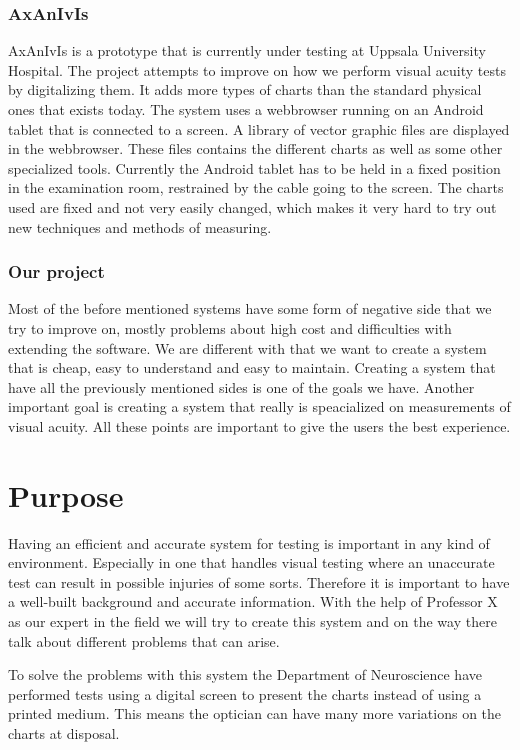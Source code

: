 \documentclass[12pt,a4paper,notitlepage]{report}
\begin{document}
\subsubsection{AxAnIvIs}
AxAnIvIs is a prototype that is currently under testing at Uppsala University Hospital. The project attempts to improve on how we perform visual acuity tests by digitalizing them. It adds more types of charts than the standard physical ones that exists today. The system uses a webbrowser running on an Android tablet that is connected to a screen. A library of vector graphic files are displayed in the webbrowser. These files contains the different charts as well as some other specialized tools. Currently the Android tablet has to be held in a fixed position in the examination room, restrained by the cable going to the screen. The charts used are fixed and not very easily changed, which makes it very hard to try out new techniques and methods of measuring.

\subsubsection{Our project}
Most of the before mentioned systems have some form of negative side that we try to improve on, mostly problems about high cost and difficulties with extending the software. We are different with that we want to create a system that is cheap, easy to understand and easy to maintain. Creating a system that have all the previously mentioned sides is one of the goals we have. Another important goal is creating a system that really is speacialized on measurements of visual acuity. All these points are important to give the users the best experience.

\section{Purpose}
Having an efficient and accurate system for testing is important in any kind of environment. Especially in one that handles visual testing where an unaccurate test can result in possible injuries of some sorts. Therefore it is important to have a well-built background and accurate information. With the help of Professor %
X as our expert in the field we will try to create this system and on the way there talk about different problems that can arise. 

To solve the problems with this system the Department of Neuroscience have performed tests using a digital screen to present the charts instead of using a printed medium. This means the optician can have many more variations on the charts at disposal. %
\end{document}
